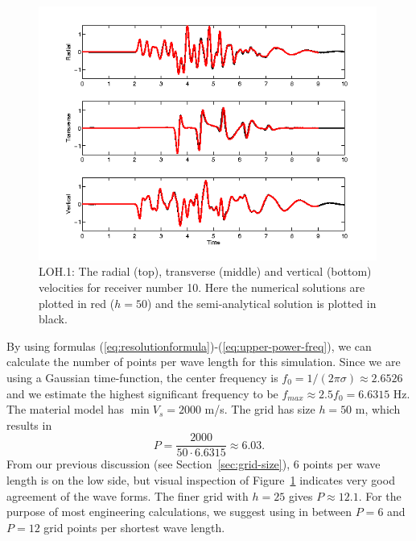 \documentclass[11pt]{report}
\begin{document}
\begin{figure}[ht]
  \begin{center}
    \includegraphics[width=0.99\textwidth]{LOH1.png}
    \caption{LOH.1: The radial (top), transverse (middle) and vertical (bottom) velocities for
      receiver number 10. Here the numerical solutions are plotted in red ($h=50$) and the semi-analytical solution is plotted in black.}
    \label{fig:LOH1}
  \end{center}
\end{figure}

By using formulas (\ref{eq:resolutionformula})-(\ref{eq:upper-power-freq}), we can calculate the
number of points per wave length for this simulation. Since we are using a Gaussian time-function,
the center frequency is $f_0=1/(2\pi\sigma)\approx 2.6526$ and we estimate the highest significant
frequency to be $f_{max}\approx 2.5 f_0 = 6.6315$ Hz. The material model has $\min V_s = 2000$
m/s. The grid has size $h=50$ m, which results in
\[
P = \dfrac{2000}{50\cdot 6.6315} \approx 6.03.
\]
From our previous discussion (see Section~\ref{sec:grid-size}), 6 points per wave length is on the
low side, but visual inspection of Figure~\ref{fig:LOH1} indicates very good agreement of the wave
forms. The finer grid with $h=25$ gives $P\approx 12.1$. For the purpose of most engineering
calculations, we suggest using in between $P=6$ and $P=12$ grid points per shortest wave length.
\end{document}
